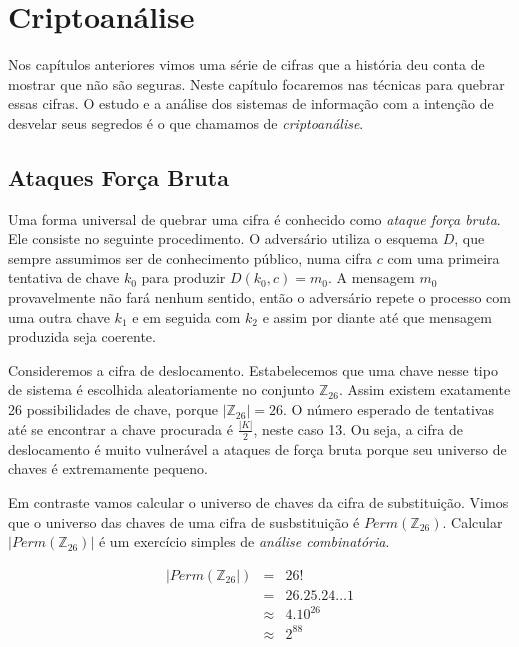\chapter{Criptoanálise}
\label{cha:criptoanalise}

Nos capítulos anteriores vimos uma série de cifras que a história deu conta de mostrar que não são seguras.
Neste capítulo focaremos nas técnicas para quebrar essas cifras.
O estudo e a análise dos sistemas de informação com a intenção de desvelar seus segredos é o que chamamos de {\em criptoanálise}.

\section{Ataques Força Bruta}
\label{sec:forca-bruta}

Uma forma universal de quebrar uma cifra é conhecido como {\em ataque força bruta}.
Ele consiste no seguinte procedimento.
O adversário utiliza o esquema $D$, que sempre assumimos ser de conhecimento público, numa cifra $c$ com uma primeira tentativa de chave $k_0$ para produzir $D(k_0, c) = m_0$.
A mensagem $m_0$ provavelmente não fará nenhum sentido, então o adversário repete o processo com uma outra chave $k_1$ e em seguida com $k_2$ e assim por diante até que mensagem produzida seja coerente.

Consideremos a cifra de deslocamento.
Estabelecemos que uma chave nesse tipo de sistema é escolhida aleatoriamente no conjunto $\mathbb{Z}_{26}$.
Assim existem exatamente 26 possibilidades de chave, porque $|\mathbb{Z}_{26}| = 26$.
O número esperado de tentativas até se encontrar a chave procurada é $\frac{|K|}{2}$, neste caso 13.
Ou seja, a cifra de deslocamento é muito vulnerável a ataques de força bruta porque seu universo de chaves é extremamente pequeno.

Em contraste vamos calcular o universo de chaves da cifra de substituição.
Vimos que o universo das chaves de uma cifra de susbstituição é $Perm(\mathbb{Z}_{26})$.
Calcular $|Perm(\mathbb{Z}_{26})|$ é um exercício simples de {\em análise combinatória}.

\begin{eqnarray*}
  |Perm(\mathbb{Z}_{26}|) & = & 26!\\
                         & = & 26.25.24 \dots 1\\
                         & \approx & 4.10^{26}\\
                         & \approx & 2^{88}
\end{eqnarray*}

